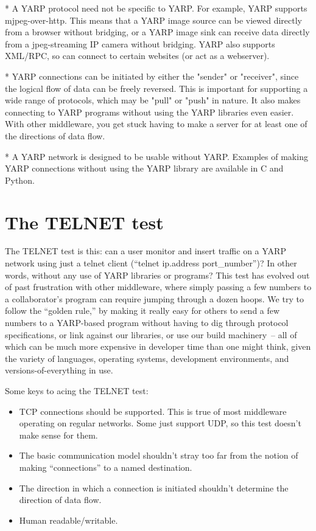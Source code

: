 \documentclass[letterpaper]{article}
\begin{document}
* A YARP protocol need not be specific to YARP.  For example, YARP supports mjpeg-over-http.  This means that a YARP image source can be viewed directly from a browser without bridging, or a YARP image sink can receive data directly from a jpeg-streaming IP camera without bridging.  YARP also supports XML/RPC, so can connect to certain websites (or act as a webserver).

* YARP connections can be initiated by either the "sender" or "receiver", since the logical flow of data can be freely reversed.  This is important for supporting a wide range of protocols, which may be "pull" or "push" in nature.  It also makes connecting to YARP programs without using the YARP libraries even easier.  With other middleware, you get stuck having to make a server for at least one of the directions of data flow.

* A YARP network is designed to be usable without YARP.  Examples of making YARP connections without using the YARP library are available in C and Python.


\section{The TELNET test}

The TELNET test is this: can a user monitor and insert traffic on a
YARP network using just a telnet client (``telnet ip.address
port\_number'')?  In other words, without any use of YARP libraries or
programs?  This test has evolved out of past frustration with other
middleware, where simply passing a few numbers to a collaborator's
program can require jumping through a dozen hoops.  We try to follow
the ``golden rule,'' by making it really easy for others to send a few
numbers to a YARP-based program without having to dig through protocol
specifications, or link against our libraries, or use our build
machinery~-- all of which can be much more expensive in developer time
than one might think, given the variety of languages, operating
systems, development environments, and versions-of-everything in use.

Some keys to acing the TELNET test:

\begin{itemize}

\item TCP connections should be supported.  
  This is true of most middleware operating on regular
  networks. Some just support UDP, so this test doesn't
  make sense for them.

\item The basic communication model shouldn't stray too far from the
  notion of making ``connections'' to a named destination.

\item The direction in which a connection is initiated shouldn't
  determine the direction of data flow.

\item Human readable/writable.

\end{itemize}
\end{document}
